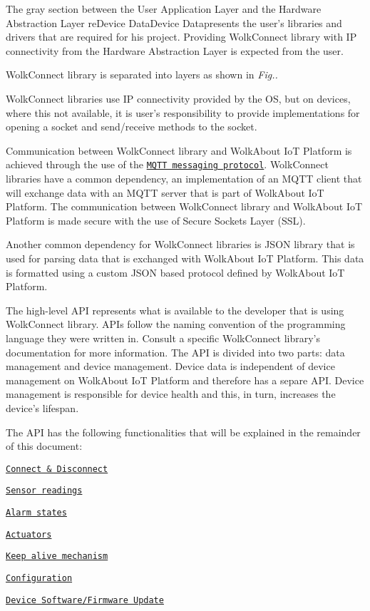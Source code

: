 \begin{center} \end{center} 

The gray section between the User Application Layer and the Hardware Abstraction Layer re\+Device Data\+Device Datapresents the user’s libraries and drivers that are required for his project. Providing Wolk\+Connect library with IP connectivity from the Hardware Abstraction Layer is expected from the user.

Wolk\+Connect library is separated into layers as shown in {\itshape Fig..} \begin{center} \end{center} 

Wolk\+Connect libraries use IP connectivity provided by the OS, but on devices, where this not available, it is user’s responsibility to provide implementations for opening a socket and send/receive methods to the socket.

Communication between Wolk\+Connect library and Wolk\+About IoT Platform is achieved through the use of the \href{http://mqtt.org/}{\tt M\+Q\+TT messaging protocol}. Wolk\+Connect libraries have a common dependency, an implementation of an M\+Q\+TT client that will exchange data with an M\+Q\+TT server that is part of Wolk\+About IoT Platform. The communication between Wolk\+Connect library and Wolk\+About IoT Platform is made secure with the use of Secure Sockets Layer (S\+SL).

Another common dependency for Wolk\+Connect libraries is J\+S\+ON library that is used for parsing data that is exchanged with Wolk\+About IoT Platform. This data is formatted using a custom J\+S\+ON based protocol defined by Wolk\+About IoT Platform.

The high-\/level A\+PI represents what is available to the developer that is using Wolk\+Connect library. A\+P\+Is follow the naming convention of the programming language they were written in. Consult a specific Wolk\+Connect library’s documentation for more information. The A\+PI is divided into two parts\+: data management and device management. Device data is independent of device management on Wolk\+About IoT Platform and therefore has a separe A\+PI. Device management is responsible for device health and this, in turn, increases the device’s lifespan.

The A\+PI has the following functionalities that will be explained in the remainder of this document\+:
\begin{DoxyItemize}
\item \href{#connect-and-disconnect}{\tt Connect \& Disconnect}
\item \href{#sensor-readings}{\tt Sensor readings}
\item \href{#alarms}{\tt Alarm states}
\item \href{#actuators}{\tt Actuators}
\item \href{#keep-alive-mechanism}{\tt Keep alive mechanism}
\item \href{#configuration}{\tt Configuration}
\item \href{#dfu}{\tt Device Software/\+Firmware Update}
\end{DoxyItemize}



